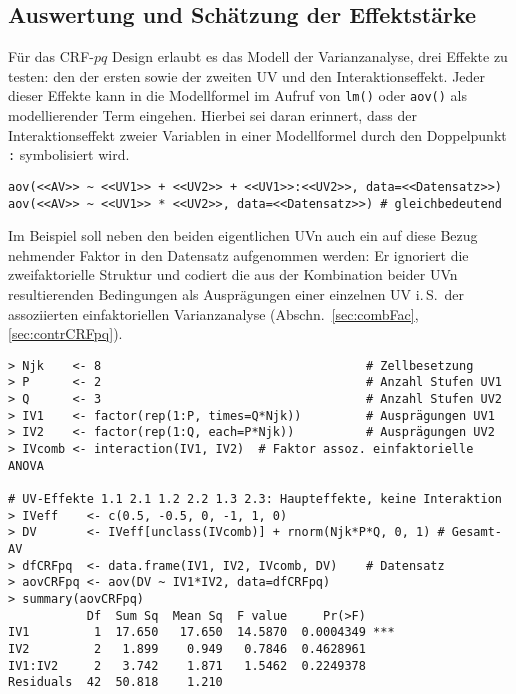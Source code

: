 \subsection{Auswertung und Schätzung der Effektstärke}
\label{sec:CRFpqAov}

Für das CRF-$pq$ Design erlaubt es das Modell der Varianzanalyse, drei Effekte zu testen: den der ersten sowie der zweiten UV und den Interaktionseffekt. Jeder dieser Effekte kann in die Modellformel im Aufruf von \lstinline!lm()! oder \lstinline!aov()! als modellierender Term eingehen. Hierbei sei daran erinnert, dass der Interaktionseffekt zweier Variablen in einer Modellformel durch den Doppelpunkt \lstinline!:! symbolisiert wird.
\begin{lstlisting}
aov(<<AV>> ~ <<UV1>> + <<UV2>> + <<UV1>>:<<UV2>>, data=<<Datensatz>>)
aov(<<AV>> ~ <<UV1>> * <<UV2>>, data=<<Datensatz>>) # gleichbedeutend
\end{lstlisting}

Im Beispiel soll neben den beiden eigentlichen UVn auch ein auf diese Bezug nehmender Faktor in den Datensatz aufgenommen werden: Er ignoriert die zweifaktorielle Struktur und codiert die aus der Kombination beider UVn resultierenden Bedingungen als Ausprägungen einer einzelnen UV i.\,S.\ der assoziierten einfaktoriellen Varianzanalyse (Abschn.\ \ref{sec:combFac}, \ref{sec:contrCRFpq}).
\begin{lstlisting}
> Njk    <- 8                                     # Zellbesetzung
> P      <- 2                                     # Anzahl Stufen UV1
> Q      <- 3                                     # Anzahl Stufen UV2
> IV1    <- factor(rep(1:P, times=Q*Njk))         # Ausprägungen UV1
> IV2    <- factor(rep(1:Q, each=P*Njk))          # Ausprägungen UV2
> IVcomb <- interaction(IV1, IV2)  # Faktor assoz. einfaktorielle ANOVA

# UV-Effekte 1.1 2.1 1.2 2.2 1.3 2.3: Haupteffekte, keine Interaktion
> IVeff    <- c(0.5, -0.5, 0, -1, 1, 0)
> DV       <- IVeff[unclass(IVcomb)] + rnorm(Njk*P*Q, 0, 1) # Gesamt-AV
> dfCRFpq  <- data.frame(IV1, IV2, IVcomb, DV)    # Datensatz
> aovCRFpq <- aov(DV ~ IV1*IV2, data=dfCRFpq)
> summary(aovCRFpq)
           Df  Sum Sq  Mean Sq  F value     Pr(>F)
IV1         1  17.650   17.650  14.5870  0.0004349 ***
IV2         2   1.899    0.949   0.7846  0.4628961
IV1:IV2     2   3.742    1.871   1.5462  0.2249378
Residuals  42  50.818    1.210
\end{lstlisting}

